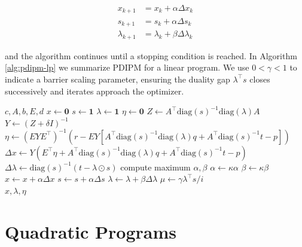 \documentclass[12pt,titlepage]{report}
\begin{document}
	\begin{align}
		x_{k+1} &= x_k + \alpha \Delta x_k \\
		s_{k+1} &= s_k + \alpha \Delta s_k \\
		\lambda_{k+1} &= \lambda_k + \beta \Delta \lambda_k
	\end{align}
	
	and the algorithm continues until a stopping condition is reached.  In Algorithm \ref{alg:pdipm-lp} we summarize PDIPM for a linear program.  We use \( 0 < \gamma < 1 \) to indicate a barrier scaling parameter, ensuring the duality gap \( \lambda^\top s \) closes successively and iterates approach the optimizer.
	
	\begin{algorithm}[htbp!]
		\caption{Primal-Dual Interior Point Method for Linear Programming}
		\label{alg:pdipm-lp}
		\begin{algorithmic}[1]
			\Require \( c, A, b, E, d \)
			\State \( x \gets \mathbf{0} \)
			\State \( s \gets \mathbf{1} \)
			\State \( \lambda \gets \mathbf{1} \)
			\State \( \eta \gets \mathbf{0} \)
				\State \( Z \gets A^\top \mathrm{diag}(s)^{-1} \mathrm{diag}(\lambda) A \)
				\State \( Y \gets \left(Z + \delta I \right)^{-1} \)
 				\State \( \eta \gets \left( E Y E^\top \right)^{-1} \left( r - E Y [ A^\top \mathrm{diag}(s)^{-1} \mathrm{diag}(\lambda) q + A^\top \mathrm{diag}(s)^{-1} t - p ] \right) \)
 				\State \( \Delta x \gets Y \left( E^\top \eta + A^\top \mathrm{diag}(s)^{-1} \mathrm{diag}(\lambda) q + A^\top \mathrm{diag}(s)^{-1} t - p \right) \)
 				\State \( \Delta \lambda \gets \mathrm{diag}(s)^{-1} \left( t - \lambda \odot s \right) \)
 				\State compute maximum \( \alpha, \beta \)
 					\State \( \alpha \gets \kappa \alpha \)
 					\State \( \beta \gets \kappa \beta \) 
 				\EndWhile
 				\State \( x \gets x + \alpha \Delta x \)
 				\State \( s \gets s + \alpha \Delta s \)
 				\State \( \lambda \gets \lambda + \beta \Delta \lambda \)
 				\State \( \mu \gets \gamma \lambda^\top s / i \)
			\EndWhile \\
			\Return \( x, \lambda, \eta \)
		\end{algorithmic}
	\end{algorithm}
	
	\chapter{Quadratic Programs}
	
\end{document}
